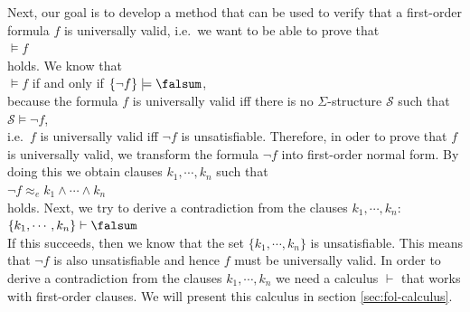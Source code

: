 Next, our goal is to develop a method that can be used to verify that a first-order formula
$f$ is universally valid, i.e.~we want to be able to prove that \\[0.2cm]
\hspace*{1.3cm}
$\models f$
\\[0.2cm]
holds.  We know that \\[0.2cm]
\hspace*{1.3cm}
$\models f$ \quad if and only if \quad $\{\neg f\} \models \falsum$, \\[0.2cm]
because the formula $f$ is universally valid iff there is no $\Sigma$-structure $\mathcal{S}$ such that
\\[0.2cm]
\hspace*{1.3cm}
$\mathcal{S} \models \neg f$,
\\[0.2cm]
i.e.~$f$ is universally valid iff $\neg f$ is unsatisfiable. 
Therefore, in oder to prove that $f$ is universally valid, we transform the formula $\neg f$  into 
first-order normal form.  By doing this we obtain clauses $k_1, \cdots, k_n$ such that \\[0.2cm]
\hspace*{1.3cm} $\neg f \approx_e k_1 \wedge \cdots \wedge k_n$ \\[0.2cm]
holds.  Next,  we try to
derive a contradiction from the clauses $k_1,\cdots,k_n$: \\[0.2cm]
\hspace*{1.3cm} $\{k_1, \cdots, k_n\} \vdash \falsum$ \\[0.2cm]
If this succeeds, then we know that the set $\{k_1, \cdots, k_n\}$ is unsatisfiable.
This means that $\neg f$ is also unsatisfiable and hence $f$ must be universally valid.
In order to derive a contradiction from the clauses $k_1,\cdots,k_n$
we need a calculus $\vdash$ that works with first-order clauses. 
We will present this calculus in section \ref{sec:fol-calculus}.

